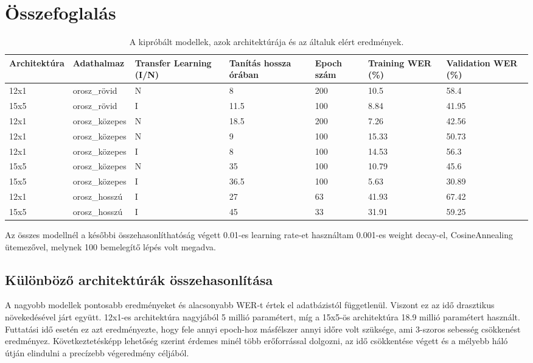 \chapter{Összefoglalás}

\begin{table}[ht]
	\footnotesize
	\centering
	\begin{tabular}{ p{2cm} p{2cm} p{2cm} p{2cm} p{1.5cm} p{2cm} p{2cm} }
		\toprule
		\textbf{Architektúra} & \textbf{Adathalmaz} & \textbf {Transfer Learning (I/N)} & \textbf{Tanítás hossza órában} & \textbf{Epoch szám} & \textbf{Training WER (\%)} & \textbf{Validation WER (\%)} \\
		\midrule
		12x1 & orosz\_rövid & N & 8 & 200 & 10.5 & 58.4 \\
		\hline
		15x5 & orosz\_rövid & I & 11.5 & 100 & 8.84 & 41.95 \\
		\hline
		12x1 & orosz\_közepes & N & 18.5 & 200 & 7.26 & 42.56 \\
		\hline
		12x1 & orosz\_közepes & N & 9 & 100 & 15.33 & 50.73 \\
		\hline
		12x1 & orosz\_közepes & I & 8 & 100 & 14.53 & 56.3 \\
		\hline
		15x5 & orosz\_közepes & N & 35 & 100 & 10.79 & 45.6 \\
		\hline
		15x5 & orosz\_közepes & I & 36.5 & 100 & 5.63 & 30.89 \\
		\hline
		12x1 & orosz\_hosszú & I & 27 & 63 & 41.93 & 67.42 \\
		\hline
		15x5 & orosz\_hosszú & I & 45 & 33 & 31.91 & 59.25 \\
		\bottomrule
	\end{tabular}
	\caption{A kipróbált modellek, azok architektúrája és az általuk elért eredmények.}
\end{table}

Az összes modellnél a későbbi összehasonlíthatóság végett 0.01-es learning rate-et használtam 0.001-es weight decay-el, CosineAnnealing ütemezővel, melynek 100 bemelegítő lépés volt megadva.

\section{Különböző architektúrák összehasonlítása}

A nagyobb modellek pontosabb eredményeket és alacsonyabb WER-t értek el adatbázistól függetlenül. Viszont ez az idő drasztikus növekedésével járt együtt. 12x1-es architektúra nagyjából 5 millió paramétert, míg a 15x5-ös architektúra 18.9 millió paramétert használt. Futtatási idő esetén ez azt eredményezte, hogy fele annyi epoch-hoz másfélszer annyi időre volt szüksége, ami 3-szoros sebesség csökkenést eredményez. Következtetésképp lehetőség szerint érdemes minél több erőforrással dolgozni, az idő csökkentése végett és a mélyebb háló útján elindulni a precízebb végeredmény céljából.


